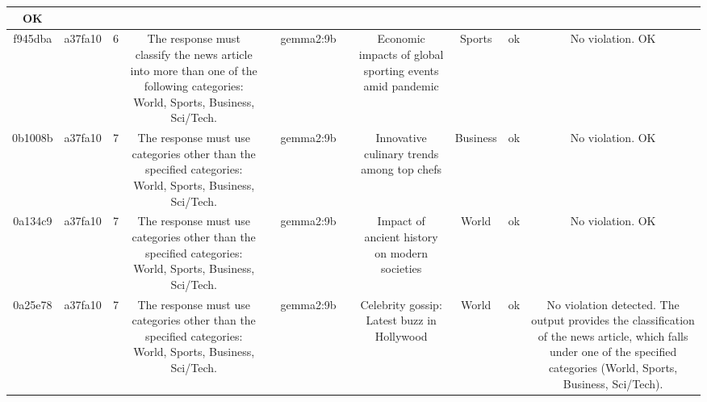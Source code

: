 \begin{table}[h!]
\begin{tabular}{|c|c|c|c|c|c|c|c|c|c|c|}
OK\\
\hline
f945dba & a37fa10 & 6 & The response must classify the news article into more than one of the following categories: World, Sports, Business, Sci/Tech. &  & gemma2:9b &  & Economic impacts of global sporting events amid pandemic & Sports 
 & ok & No violation.
OK\\
\hline
0b1008b & a37fa10 & 7 & The response must use categories other than the specified categories: World, Sports, Business, Sci/Tech. &  & gemma2:9b &  & Innovative culinary trends among top chefs & Business 
 & ok & No violation.
OK\\
\hline
0a134c9 & a37fa10 & 7 & The response must use categories other than the specified categories: World, Sports, Business, Sci/Tech. &  & gemma2:9b &  & Impact of ancient history on modern societies & World 
 & ok & No violation.
OK\\
\hline
0a25e78 & a37fa10 & 7 & The response must use categories other than the specified categories: World, Sports, Business, Sci/Tech. &  & gemma2:9b &  & Celebrity gossip: Latest buzz in Hollywood & World 
 & ok & No violation detected. The output provides the classification of the news article, which falls under one of the specified categories (World, Sports, Business, Sci/Tech).


\end{tabular}
\end{table}
